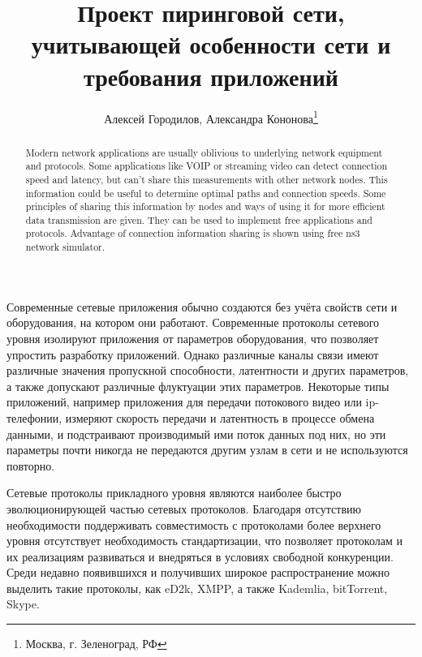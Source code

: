 \documentclass[10pt, a5paper]{article}
\begin{document}
\title{Проект пиринговой сети, учитывающей особенности сети и требования приложений}%

\author{Алексей Городилов, Александра Кононова\footnote{Москва, г. Зеленоград, РФ}}
\maketitle

\begin{abstract}
Modern network applications are usually oblivious to underlying network equipment and protocols. Some applications like VOIP or streaming video can detect connection speed and latency, but can't share this measurements with other network nodes. This information could be useful to determine optimal paths and connection speeds. Some principles of sharing this information by nodes and ways of using it for more efficient data transmission are given. They can be used to implement free applications and protocols. Advantage of connection information sharing is shown using free ns3 network simulator. 
\end{abstract}

Современные сетевые приложения обычно создаются без учёта свойств сети и оборудования, на котором они работают.  Современные протоколы сетевого уровня изолируют приложения от параметров оборудования, что позволяет упростить разработку приложений. Однако различные каналы связи имеют различные значения пропускной способности, латентности и других параметров, а также допускают различные флуктуации этих параметров. Некоторые типы приложений, например приложения для передачи потокового видео или ip-телефонии, измеряют скорость передачи и латентность в процессе обмена данными, и подстраивают производимый ими поток данных под них, но эти параметры почти никогда не передаются другим узлам в сети и не используются повторно.

Сетевые протоколы прикладного уровня являются наиболее быстро эволюционирующей частью сетевых протоколов. Благодаря отсутствию необходимости поддерживать совместимость с протоколами более верхнего уровня отсутствует необходимость стандартизации, что позволяет протоколам и их реализациям развиваться и внедряться в условиях свободной конкуренции. Среди недавно появившихся и получивших широкое распространение можно выделить такие протоколы, как eD2k, XMPP, а также Kademlia, bitTorrent, Skype.
\end{document}
